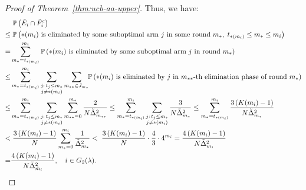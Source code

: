 \documentclass[
  12pt]{article}
\begin{document}
\begin{proof}[Proof of Theorem~\ref{thm:ucb-aa-upper}]
Thus, we have: 
\begin{align}
&\;\mathbb{P}\left(\tilde{E}_i\cap\tilde{F}_i^c\right)\notag\\
    \leq &\;\mathbb{P}\left(*(m_i) \text{ is eliminated by some suboptimal arm } j \text{ in some round } m_*,\; t_{*(m_i)} \leq m_* \leq m_i\right)\notag\\
   = &\sum_{m_* = t_{*(m_i)}}^{m_i} \mathbb{P}\left(*(m_i) \text{ is eliminated by some suboptimal arm } j \text{ in round } m_*\right) \notag\\
\leq & \sum_{m_* = t_{*(m_i)}}^{m_i} \sum_{\substack{j :\,t_j\leq m_*\\j\neq *(m_i)}}\sum_{m_{**}\in J_{m_*}} \!\!\mathbb{P}\left(*(m_i) \text{ is eliminated by } j \text{ in $m_{**}$-th elimination phase of round } m_*\right) \notag\\
\leq & \sum_{m_* = t_{*(m_i)}}^{m_i}  \sum_{\substack{j :\,t_j\leq m_*\\j\neq *(m_i)}} \sum_{m_{**}=0}^{m_*}\frac{2}{N \tilde{\Delta}_{m_{**}}^2}\leq \sum_{m_* = t_{*(m_i)}}^{m_i}  \sum_{\substack{j :\,t_j\leq m_*\\j\neq *(m_i)}} \frac{3}{N \tilde{\Delta}_{m_*}^2}\leq\sum_{m_* = t_{*(m_i)}}^{m_i}   \frac{3\left(K(m_i)-1\right)}{N \tilde{\Delta}_{m_*}^2}\notag\\
<& \;\frac{3\left(K(m_i)-1\right)}{N } \sum_{m_* = 0}^{m_i}   \frac{1}{ \tilde{\Delta}_{m_*}^2} < \;\frac{3\left(K(m_i)-1\right)}{N}\cdot \frac{4}{3}\cdot4^{m_i}=\frac{4\left(K(m_i)-1\right)}{N\tilde{\Delta}_{m_i}^2}\notag\\
=&\frac{4\left(K(m_i)-1\right)}{N\tilde{\Delta}_{\tilde{m}_i}^2}, \quad i\in G_2(\lambda).
\label{eq: UCB-A3 G-2 b2}
\end{align}


\end{proof}
\end{document}
